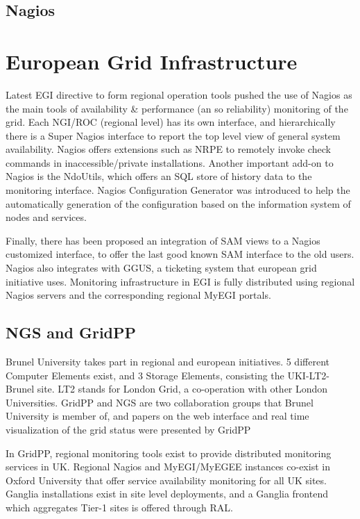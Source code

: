 \subsection{Nagios}

\section{European Grid Infrastructure}
Latest EGI directive to form regional operation tools pushed the use of Nagios \cite{imamagic2007grid} as the main tools of availability \& performance (an so reliability) monitoring of the grid. Each NGI/ROC (regional level) has its own interface, and hierarchically there is a Super Nagios interface to report the top level view of general system availability. Nagios offers extensions such as NRPE to remotely invoke check commands in inaccessible/private installations. Another important add-on to Nagios is the NdoUtils, which offers an SQL store of history data to the monitoring interface. Nagios Configuration Generator was introduced to help the automatically generation of the configuration based on the information system of nodes and services.

Finally, there has been proposed an integration of SAM views to a Nagios customized interface, to offer the last good known SAM interface to the old users. Nagios also integrates with GGUS, a ticketing system that european grid initiative uses. Monitoring infrastructure in EGI is fully distributed using regional Nagios servers and the corresponding regional MyEGI portals.

\subsection{NGS and GridPP}
Brunel University takes part in regional and european initiatives. 5 different Computer Elements exist, and 3 Storage Elements, consisting the UKI-LT2-Brunel site. LT2 stands for London Grid, a co-operation with other London Universities. GridPP and NGS are two collaboration groups that Brunel University is member of, and papers on the web interface \cite{Hobson2007} and real time visualization of the grid status were presented \cite{Huang2007} by GridPP

In GridPP, regional monitoring tools exist to provide distributed monitoring services in UK. Regional Nagios and MyEGI/MyEGEE instances co-exist in Oxford University that offer service availability monitoring for all UK sites. Ganglia installations exist in site level deployments, and a Ganglia frontend which aggregates Tier-1 sites is offered through RAL.
